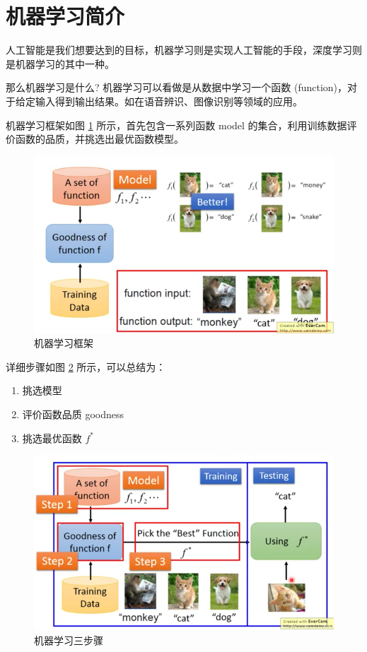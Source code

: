 \section{机器学习简介}
人工智能是我们想要达到的目标，机器学习则是实现人工智能的手段，深度学习则是机器学习的其中一种。

那么机器学习是什么? 机器学习可以看做是从数据中学习一个函数 (function)，对于给定输入得到输出结果。如在语音辨识、图像识别等领域的应用。

机器学习框架如图 \ref{fig:ml_framework} 所示，首先包含一系列函数 model 的集合，利用训练数据评价函数的品质，并挑选出最优函数模型。

\begin{figure}[ht]
	\centering
	\includegraphics[scale=0.4]{./pic/ml_framework.png}
	\caption{机器学习框架}
	\label{fig:ml_framework}
\end{figure}
  
详细步骤如图 \ref{fig:three_step} 所示，可以总结为：

\begin{enumerate}
	\item 挑选模型
	\item 评价函数品质 goodness
	\item 挑选最优函数 $f^*$
\end{enumerate}
	
\begin{figure}[ht]
	\centering
	\includegraphics[scale=0.4]{./pic/three_step_of_ml.png}
	\caption{机器学习三步骤}
	\label{fig:three_step}
\end{figure}

